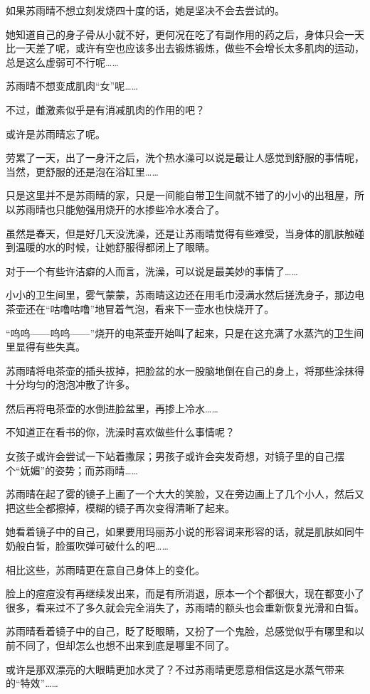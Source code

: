 如果苏雨晴不想立刻发烧四十度的话，她是坚决不会去尝试的。

她知道自己的身子骨从小就不好，更何况在吃了有副作用的药之后，身体只会一天比一天差了呢，或许有空也应该多出去锻炼锻炼，做些不会增长太多肌肉的运动，总是这么虚弱可不行呢……

苏雨晴不想变成肌肉“女”呢……

不过，雌激素似乎是有消减肌肉的作用的吧？

或许是苏雨晴忘了呢。

劳累了一天，出了一身汗之后，洗个热水澡可以说是最让人感觉到舒服的事情呢，当然，更舒服的还是泡在浴缸里……

只是这里并不是苏雨晴的家，只是一间能自带卫生间就不错了的小小的出租屋，所以苏雨晴也只能勉强用烧开的水掺些冷水凑合了。

虽然是春天，但是好几天没洗澡，还是让苏雨晴觉得有些难受，当身体的肌肤触碰到温暖的水的时候，让她舒服得都闭上了眼睛。

对于一个有些许洁癖的人而言，洗澡，可以说是最美妙的事情了……

小小的卫生间里，雾气蒙蒙，苏雨晴这边还在用毛巾浸满水然后搓洗身子，那边电茶壶还在“咕噜咕噜”地冒着气泡，看来下一壶水也快烧开了。

“呜呜——呜呜——”烧开的电茶壶开始叫了起来，只是在这充满了水蒸汽的卫生间里显得有些失真。

苏雨晴将电茶壶的插头拔掉，把脸盆的水一股脑地倒在自己的身上，将那些涂抹得十分均匀的泡泡冲散了许多。

然后再将电茶壶的水倒进脸盆里，再掺上冷水……

不知道正在看书的你，洗澡时喜欢做些什么事情呢？

女孩子或许会尝试一下站着撒尿；男孩子或许会突发奇想，对镜子里的自己摆个“妩媚”的姿势；而苏雨晴……

苏雨晴在起了雾的镜子上画了一个大大的笑脸，又在旁边画上了几个小人，然后又把这些全都擦掉，模糊的镜子再次变得清晰了起来。

她看着镜子中的自己，如果要用玛丽苏小说的形容词来形容的话，就是肌肤如同牛奶般白皙，脸蛋吹弹可破什么的吧……

相比这些，苏雨晴更在意自己身体上的变化。

脸上的痘痘没有再继续发出来，而是有所消退，原本一个个都很大，现在都变小了很多，看来过不了多久就会完全消失了，苏雨晴的额头也会重新恢复光滑和白皙。

苏雨晴看着镜子中的自己，眨了眨眼睛，又扮了一个鬼脸，总感觉似乎有哪里和以前不同了，但却怎么也想不出来到底是哪里不同了。

或许是那双漂亮的大眼睛更加水灵了？不过苏雨晴更愿意相信这是水蒸气带来的“特效”……

